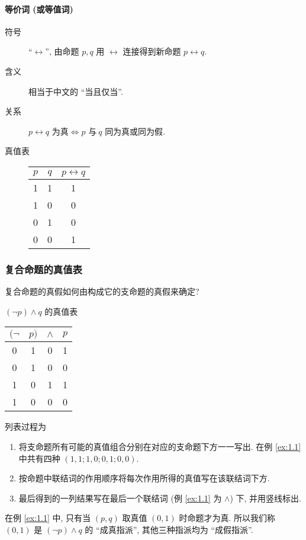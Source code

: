 \documentclass[
    color=black,
    device=normal,
    lang=cn
]{elegantnote}
\begin{document}
\paragraph{等价词 (或等值词)}
\begin{description}
    \item[符号] ``$\leftrightarrow$'', 由命题 $p,q$ 用 $\leftrightarrow$ 连接得到新命题 $p\leftrightarrow q$.
    \item[含义] 相当于中文的 ``当且仅当''.
    \item[关系] $p\leftrightarrow q\text{ 为真}\Leftrightarrow p\text{ 与}\ q\text{ 同为真或同为假}$.
    \item[真值表]
        \begin{tabular}{c|c|c}
            $p$ & $q$ & $p\leftrightarrow q$ \\
            \hline
            1   & 1   & 1                    \\
            1   & 0   & 0                    \\
            0   & 1   & 0                    \\
            0   & 0   & 1
        \end{tabular}
\end{description}
\subsubsection{复合命题的真值表}
复合命题的真假如何由构成它的支命题的真假来确定?
\begin{example}\label{ex:1.1}
    $(\lnot p)\land q$ 的真值表
    \begin{table}[!htbp]
        \centering
        \begin{tabular}{cc|c|c}
            $(\lnot$ & $p)$ & $\land$ & $p$ \\
            \hline
            0        & 1    & 0       & 1   \\
            0        & 1    & 0       & 0   \\
            1        & 0    & 1       & 1   \\
            1        & 0    & 0       & 0
        \end{tabular}
    \end{table}
\end{example}
列表过程为
\begin{enumerate}[topsep = -1em]
    \item 将支命题所有可能的真值组合分别在对应的支命题下方一一写出. 在例 \ref{ex:1.1} 中共有四种 $(1, 1; 1, 0; 0, 1; 0, 0)$.
    \item 按命题中联结词的作用顺序将每次作用所得的真值写在该联结词下方.
    \item 最后得到的一列结果写在最后一个联结词 (例 \ref{ex:1.1} 为 $\land$) 下, 并用竖线标出.
\end{enumerate}
在例 \ref{ex:1.1} 中, 只有当 $(p, q)$ 取真值 $(0,1)$ 时命题才为真. 所以我们称 $(0,1)$ 是 $(\lnot p)\land q$ 的 ``成真指派'', 其他三种指派均为 ``成假指派''.
\end{document}
